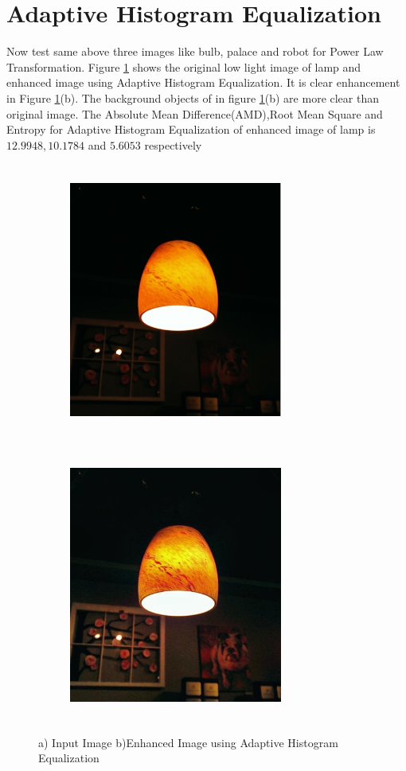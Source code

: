 \section{Adaptive Histogram Equalization}
Now test same above three images like bulb, palace and robot for Power Law Transformation. Figure \ref{fig:AHE} shows the original low light image of lamp and enhanced image using Adaptive Histogram Equalization. It is clear enhancement in Figure \ref{fig:AHE}(b). The background objects of in figure \ref{fig:AHE}(b) are more clear than original image. The Absolute Mean Difference(AMD),Root Mean Square and Entropy for Adaptive Histogram Equalization of enhanced image of lamp is $12.9948,10.1784$ and $5.6053$ respectively      


\begin{figure}[!htb]
	\begin{subfigure}{8cm}
		\centering    
    	\includegraphics[width=7cm,height=9cm,keepaspectratio]{images/ch5/bulb_input.jpg}
    	\caption{} 
    \end{subfigure}
  	\begin{subfigure}{6cm}
  		\centering
  		\includegraphics[width=7cm,height=9cm,keepaspectratio]{images/ch5/bulb_adapt_hist.jpg}
   		\caption{}
  	\end{subfigure}
  	\caption{a) Input Image b)Enhanced Image using Adaptive Histogram Equalization}
  	\label{fig:AHE}
\end{figure}


